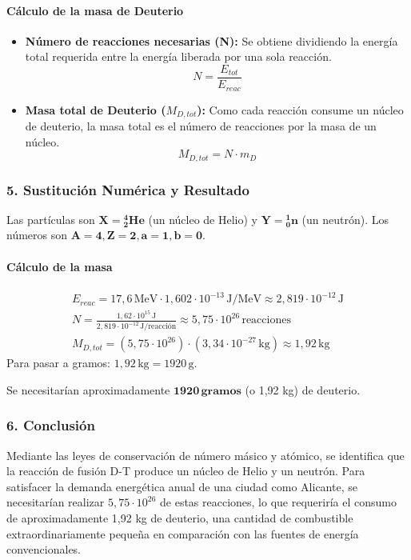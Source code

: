 \paragraph*{Cálculo de la masa de Deuterio}
\begin{itemize}
    \item \textbf{Número de reacciones necesarias (N):} Se obtiene dividiendo la energía total requerida entre la energía liberada por una sola reacción.
    $$ N = \frac{E_{tot}}{E_{reac}} $$
    \item \textbf{Masa total de Deuterio ($M_{D,tot}$):} Como cada reacción consume un núcleo de deuterio, la masa total es el número de reacciones por la masa de un núcleo.
    $$ M_{D,tot} = N \cdot m_D $$
\end{itemize}

\subsubsection*{5. Sustitución Numérica y Resultado}
\begin{cajaresultado}
    Las partículas son $\boldsymbol{X = {}_{2}^{4}He}$ (un núcleo de Helio) y $\boldsymbol{Y = {}_{0}^{1}n}$ (un neutrón).
    Los números son $\boldsymbol{A=4, Z=2, a=1, b=0}$.
\end{cajaresultado}
\medskip
\paragraph*{Cálculo de la masa}
\begin{gather}
    E_{reac} = 17,6 \, \text{MeV} \cdot 1,602 \cdot 10^{-13} \, \text{J/MeV} \approx 2,819 \cdot 10^{-12} \, \text{J} \\
    N = \frac{1,62 \cdot 10^{15} \, \text{J}}{2,819 \cdot 10^{-12} \, \text{J/reacción}} \approx 5,75 \cdot 10^{26} \, \text{reacciones} \\
    M_{D,tot} = (5,75 \cdot 10^{26}) \cdot (3,34 \cdot 10^{-27} \, \text{kg}) \approx 1,92 \, \text{kg}
\end{gather}
Para pasar a gramos: $1,92 \, \text{kg} = 1920 \, \text{g}$.
\begin{cajaresultado}
    Se necesitarían aproximadamente $\boldsymbol{1920 \, \textbf{gramos}}$ (o 1,92 kg) de deuterio.
\end{cajaresultado}

\subsubsection*{6. Conclusión}
\begin{cajaconclusion}
    Mediante las leyes de conservación de número másico y atómico, se identifica que la reacción de fusión D-T produce un núcleo de Helio y un neutrón. Para satisfacer la demanda energética anual de una ciudad como Alicante, se necesitarían realizar $5,75 \cdot 10^{26}$ de estas reacciones, lo que requeriría el consumo de aproximadamente 1,92 kg de deuterio, una cantidad de combustible extraordinariamente pequeña en comparación con las fuentes de energía convencionales.
\end{cajaconclusion}

